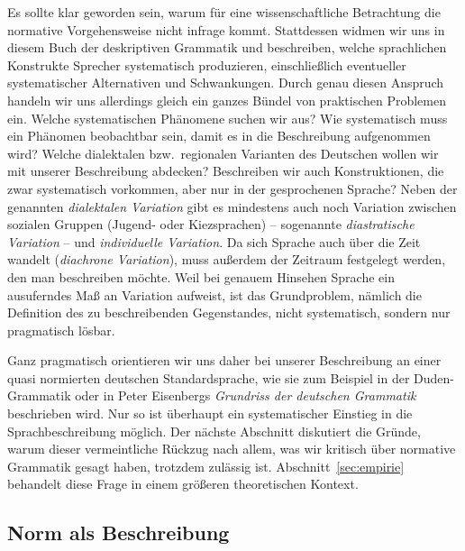 Es sollte klar geworden sein, warum für eine wissenschaftliche Betrachtung die normative Vorgehensweise nicht infrage kommt.
Stattdessen widmen wir uns in diesem Buch der deskriptiven Grammatik und beschreiben, welche sprachlichen Konstrukte Sprecher systematisch produzieren, einschließlich eventueller systematischer Alternativen und Schwankungen.
Durch genau diesen Anspruch handeln wir uns allerdings gleich ein ganzes Bündel von praktischen Problemen ein.
Welche systematischen Phänomene suchen wir aus?
Wie systematisch muss ein Phänomen beobachtbar sein, damit es in die Beschreibung aufgenommen wird?
Welche dialektalen bzw.\ regionalen Varianten des Deutschen wollen wir mit unserer Beschreibung abdecken?
Beschreiben wir auch Konstruktionen, die zwar systematisch vorkommen, aber nur in der gesprochenen Sprache?
Neben der genannten \textit{dialektalen Variation} gibt es mindestens auch noch Variation zwischen sozialen Gruppen (\zB Jugend- oder Kiezsprachen) -- sogenannte \textit{diastratische Variation} -- und \textit{individuelle Variation}.
Da sich Sprache auch über die Zeit wandelt (\textit{diachrone Variation}), muss außerdem der Zeitraum festgelegt werden, den man beschreiben möchte.
Weil bei genauem Hinsehen Sprache ein ausuferndes Maß an Variation aufweist, ist das Grundproblem, nämlich die Definition des zu beschreibenden Gegenstandes, nicht systematisch, sondern nur pragmatisch lösbar.

Ganz pragmatisch orientieren wir uns daher bei unserer Beschreibung an einer quasi normierten deutschen Standardsprache, wie sie zum Beispiel in der Duden-Grammatik \citep{Duden8} oder in Peter Eisenbergs \textit{Grundriss der deutschen Grammatik} \citep{Eisenberg2013a,Eisenberg2013b} beschrieben wird.
Nur so ist überhaupt ein systematischer Einstieg in die Sprachbeschreibung möglich.
Der nächste Abschnitt diskutiert die Gründe, warum dieser vermeintliche Rückzug nach allem, was wir kritisch über normative Grammatik gesagt haben, trotzdem zulässig ist.
Abschnitt~\ref{sec:empirie} behandelt diese Frage in einem größeren theoretischen Kontext.

\subsection{Norm als Beschreibung}
\label{sec:normalsbeschreibung}

